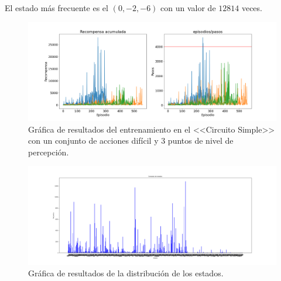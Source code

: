 El estado más frecuente es el  $(0, -2, -6)$ con un valor de $12814$ veces.

\begin{figure}[!ht]
    \centering \includegraphics[width=1\columnwidth]{./figures/anexos/simple_circuit_hard_3.png}
    \caption{Gráfica de resultados del entrenamiento en el <<Circuito Simple>> con un conjunto de acciones difícil y 3 puntos de nivel de percepción.}
\end{figure}

\begin{figure}[!ht]
    \centering \includegraphics[width=1\columnwidth]{./figures/anexos/states_counter_simple_circuit_hard_3.png}
    \caption{Gráfica de resultados de la distribución de los estados.}
\end{figure}


